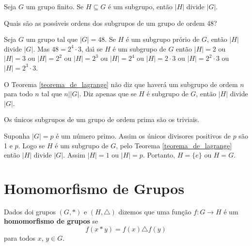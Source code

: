\begin{teorema}\label{teorema_de_lagrange}
	Seja $G$ um grupo finito. Se $H\subseteq G$ {\'e} um subgrupo, ent{\~a}o $|H|$ divide $|G|$.
\end{teorema}

\begin{exemplo}
	Quais s{\~a}o as poss{\'\i}veis ordens dos subgrupos de um grupo de ordem 48?
	\begin{solucao}
		Seja $G$ um grupo tal que $|G|=48$. Se $H$ {\'e} um subgrupo pr\'orio de $G$, ent{\~a}o $|H|$ divide $|G|$. Mas $48=2^{4}\cdot 3$, da{\'\i} se $H$ \'e um subgrupo de $G$ ent\~ao $|H|=2$ ou $|H|=3$ ou $|H|= 2^{2}$ ou $|H|=2^{3}$ ou $|H|=2^{4}$ ou $|H|=2\cdot3$ ou $|H|=2^2\cdot 3$ ou $|H|=2^3\cdot 3$.
	\end{solucao}
\end{exemplo}

\begin{observacao}
	O Teorema \ref{teorema_de_lagrange} n{\~a}o diz que haver{\'a} um subgrupo de ordem $n$ para todo $n$ tal que $n||G|$. Diz apenas que se $H$ {\'e} subgrupo de $G$, ent{\~a}o $|H|$ divide $|G|$.
\end{observacao}

\begin{corolario}
	Os {\'u}nicos subgrupos de um grupo de ordem prima s{\~a}o os triviais.
\end{corolario}
\begin{prova}
	Suponha $|G| = p$ \'e um n\'umero primo. Assim os {\'u}nicos divisores positivos de $p$ s{\~a}o 1 e $p$. Logo se $H$ {\'e} um subgrupo de $G$, pelo Teorema \ref{teorema_de_lagrange} ent{\~a}o $|H|$ divide $|G|$. Assim $|H| = 1$ ou $|H| = p$. Portanto, $H=\{e\}$ ou $H = G$.
\end{prova}

\section{Homomorfismo de Grupos} %
\label{sec:homomorfismo_de_grupos}


\begin{definicao}
	Dados doi grupos $(G, *)$ e $(H,\triangle)$ dizemos que uma fun\c{c}\~ao $f : G \to H$ \'e um \textbf{homomorfismo de grupos} se
	\[
		f(x * y) = f(x)\triangle f(y)
	\]
	para todos $x$, $y \in G$.
\end{definicao}

